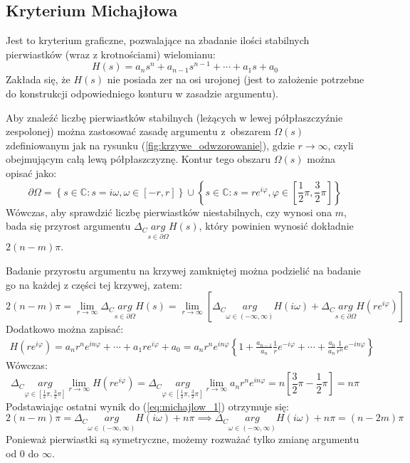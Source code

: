\documentclass{article}
\begin{document}
    \subsection{Kryterium Michajłowa}
    Jest to kryterium graficzne, pozwalające na zbadanie ilości stabilnych pierwiastków (wraz z krotnościami) wielomianu:
    $$
        H(s) = a_{n}s^{n} + a_{n-1}s^{n-1} + \cdots + a_{1}s + a_{0}
    $$
    Zakłada się, że $H(s)$ nie posiada zer na osi urojonej (jest to założenie potrzebne do konstrukcji odpowiedniego konturu w zasadzie argumentu).
    
    Aby znaleźć liczbę pierwiastków stabilnych (leżących w lewej półpłaszczyźnie zespolonej) można zastosować zasadę argumentu z~obszarem $\Omega(s)$ zdefiniowanym jak na rysunku (\ref{fig:krzywe_odwzorowanie}), gdzie $r \rightarrow \infty$, czyli obejmującym całą lewą półpłaszczyznę.
    Kontur tego obszaru $\Omega(s)$ można opisać jako:
    $$
        \partial \Omega = \left\{ s \in \mathbb{C}: s = i\omega,\omega \in [-r,r] \right\} \cup \left\{ s\in \mathbb{C}: s=re^{i\varphi},\varphi \in [\frac{1}{2}\pi, \frac{3}{2}\pi] \right\}
    $$
    Wówczas, aby sprawdzić liczbę pierwiastków niestabilnych, czy wynosi ona $m$, bada się przyrost argumentu $\Delta_{C} \underset{s\in\partial\Omega}{arg} H(s)$, który powinien wynosić dokładnie $2(n-m)\pi$.

    Badanie przyrostu argumentu na krzywej zamkniętej można podzielić na badanie go na każdej z części tej krzywej, zatem:
    \begin{equation}\label{eq:michajlow_1}
        2(n-m)\pi = \lim_{r\rightarrow\infty}\Delta_{C}\underset{s\in\partial\Omega}{arg}H(s) = 
        \lim_{r\rightarrow\infty}[\Delta_{C} \underset{\omega\in (-\infty,\infty)}{arg} H(i\omega) + \Delta_{C}\underset{s\in\partial\Omega}{arg}H(re^{i\varphi})]
    \end{equation}
    Dodatkowo można zapisać:
    $$
        \begin{array}{c}
        H(re^{i\varphi}) = a_{n}r^{n}e^{in\varphi} + \cdots + a_{1}re^{i\varphi} + a_{0} = 
        a_{n}r^{n}e^{in\varphi} \left\{ 1 + \frac{a_{n-1}}{a_{n}}\frac{1}{r}e^{-i\varphi} + \cdots + \frac{a_{0}}{a_{n}}\frac{1}{r^{n}}e^{-in\varphi} \right\}
        \end{array}
    $$
    Wówczas:
    $$
        \Delta_{C} \underset{\varphi\in[\frac{1}{2}\pi,\frac{3}{2}\pi]}{arg} \lim_{r\rightarrow\infty} H(re^{i\varphi}) =
        \Delta_{C}\underset{\varphi\in[\frac{1}{2}\pi,\frac{3}{2}\pi]}{arg} \lim_{r\rightarrow\infty} a_{n}r^{n}e^{in\varphi} =
        n[\frac{3}{2}\pi-\frac{1}{2}\pi] = n\pi
    $$
    Podstawiając ostatni wynik do (\ref{eq:michajlow_1}) otrzymuje się:
    $$
        2(n-m)\pi = \Delta_{C} \underset{\omega\in (-\infty,\infty)}{arg} H(i\omega) + n\pi
        \implies
        \Delta_{C} \underset{\omega\in (-\infty,\infty)}{arg} H(i\omega) + n\pi = (n-2m)\pi
    $$
    Ponieważ pierwiastki są symetryczne, możemy rozważać tylko zmianę argumentu od $0$ do $\infty$.
\end{document}

